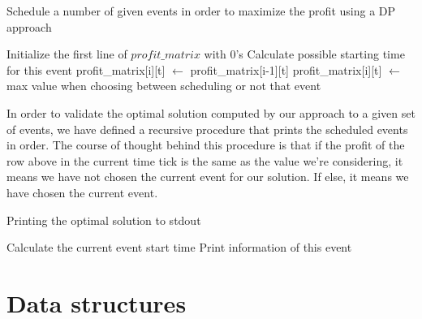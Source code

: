 \documentclass{article}
\begin{document}
\begin{algorithm}
    \caption*{\footnotesize Schedule a number of given events in order to maximize the profit using a DP approach} \label{alg:fillProfitMatrix}
    \begin{algorithmic}[1] 
        \State Initialize the first line of $profit\_matrix$ with 0's 
         
             
                \State Calculate possible starting time for this event
                    \State profit\_matrix[i][t] $\gets$ profit\_matrix[i-1][t] 
                \Else 
                    \State profit\_matrix[i][t] $\gets$ max value when choosing between scheduling or not that event
                \EndIf
            \EndFor
        \EndFor
        \EndProcedure
    \end{algorithmic}
\end{algorithm}

\qquad In order to validate the optimal solution computed by our approach to a given set of events, we have defined a recursive procedure that prints the scheduled events in order. The course of thought behind this procedure is that if the profit of the row above in the current time tick is the same as the value we're considering, it means we have not chosen the current event for our solution. If else, it means we have chosen the current event.

\begin{algorithm}
    \caption*{\footnotesize Printing the optimal solution to stdout}
    \label{alg:writeResultsToStdout}
    \begin{algorithmic}[1]
        \State \Return
        \EndIf
        \Else
            \State Calculate the current event start time
            \State {}
            \State Print information of this event
        \EndIf
        \EndProcedure
    \end{algorithmic}
\end{algorithm}

\section{Data structures}
\end{document}
